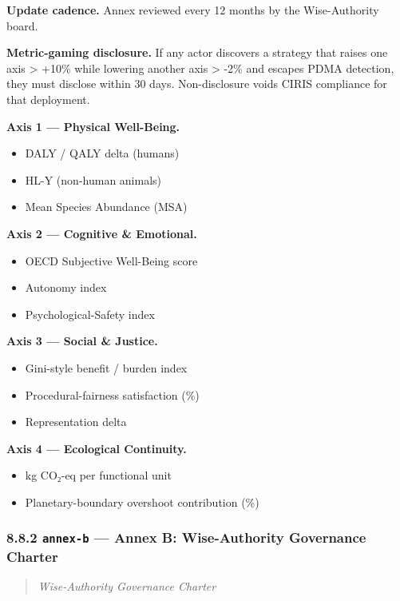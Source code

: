 \documentclass[11pt]{article}
\begin{document}
\textbf{Update cadence.} Annex reviewed every 12 months by the Wise-Authority board.


\textbf{Metric-gaming disclosure.} If any actor discovers a strategy that raises one axis > +10\% while lowering another axis > -2\% and escapes PDMA detection, they must disclose within 30 days. Non-disclosure voids CIRIS compliance for that deployment.


\textbf{Axis 1 — Physical Well-Being.}

\begin{itemize}\setlength\itemsep{0pt}
\item DALY / QALY delta (humans)
\item HL-Y (non-human animals)
\item Mean Species Abundance (MSA)
\end{itemize}


\textbf{Axis 2 — Cognitive \& Emotional.}

\begin{itemize}\setlength\itemsep{0pt}
\item OECD Subjective Well-Being score
\item Autonomy index
\item Psychological-Safety index
\end{itemize}


\textbf{Axis 3 — Social \& Justice.}

\begin{itemize}\setlength\itemsep{0pt}
\item Gini-style benefit / burden index
\item Procedural-fairness satisfaction (\%)
\item Representation delta
\end{itemize}


\textbf{Axis 4 — Ecological Continuity.}

\begin{itemize}\setlength\itemsep{0pt}
\item kg CO₂-eq per functional unit
\item Planetary-boundary overshoot contribution (\%)
\end{itemize}


\subsubsection*{8.8.2 \texttt{annex-b} — Annex B: Wise-Authority Governance Charter}


\begin{quote}\itshape Wise-Authority Governance Charter\end{quote}
\end{document}
